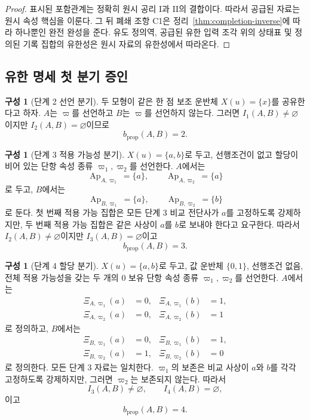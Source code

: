\documentclass[11pt]{article}
\newcommand{\Ap}{\operatorname{Ap}}
\theoremstyle{definition}
\newtheorem{construction}[theorem]{구성}
\theoremstyle{remark}
\begin{document}
\begin{proof}
표시된 포함관계는 정확히 원시 공리 I과 II의 결합이다.
따라서 공급된 자료는 원시 속성 핵심을 이룬다.
그 뒤 폐쇄 조항 C1은 정리~\ref{thm:completion-inverse}에 따라 하나뿐인 완전 완성을 준다.
유도 정의역, 공급된 유한 입력 조각 위의 상태표 및 정의된 기록 집합의 유한성은 원시 자료의 유한성에서 따라온다.
\end{proof}

\subsection{유한 명세 첫 분기 증인}

\begin{construction}[단계 2 선언 분기]
두 모형이 같은 한 점 보조 운반체 \(X(u)=\{x\}\)를 공유한다고 하자.
\(A\)는 \(\varpi\)를 선언하고 \(B\)는 \(\varpi\)를 선언하지 않는다.
그러면 \(I_1(A,B)\neq\varnothing\)이지만 \(I_2(A,B)=\varnothing\)이므로
\[
b_{\mathrm{prop}}(A,B)=2.
\]
\end{construction}

\begin{construction}[단계 3 적용 가능성 분기]
\(X(u)=\{a,b\}\)로 두고, 선행조건이 없고 할당이 비어 있는 단항 속성 종류 \(\varpi_1,\varpi_2\)를 선언한다.
\(A\)에서는
\[
\Ap_{A,\varpi_1}=\{a\},
\qquad
\Ap_{A,\varpi_2}=\{a\}
\]
로 두고, \(B\)에서는
\[
\Ap_{B,\varpi_1}=\{a\},
\qquad
\Ap_{B,\varpi_2}=\{b\}
\]
로 둔다.
첫 번째 적용 가능 집합은 모든 단계 3 비교 전단사가 \(a\)를 고정하도록 강제하지만, 두 번째 적용 가능 집합은 같은 사상이 \(a\)를 \(b\)로 보내야 한다고 요구한다.
따라서 \(I_2(A,B)\neq\varnothing\)이지만 \(I_3(A,B)=\varnothing\)이고
\[
b_{\mathrm{prop}}(A,B)=3.
\]
\end{construction}

\begin{construction}[단계 4 할당 분기]
\(X(u)=\{a,b\}\)로 두고, 값 운반체 \(\{0,1\}\), 선행조건 없음, 전체 적용 가능성을 갖는 두 개의 0 보유 단항 속성 종류 \(\varpi_1,\varpi_2\)를 선언한다.
\(A\)에서는
\[
\begin{aligned}
\Xi_{A,\varpi_1}(a)&=0,&\Xi_{A,\varpi_1}(b)&=1,\\
\Xi_{A,\varpi_2}(a)&=0,&\Xi_{A,\varpi_2}(b)&=1
\end{aligned}
\]
로 정의하고, \(B\)에서는
\[
\begin{aligned}
\Xi_{B,\varpi_1}(a)&=0,&\Xi_{B,\varpi_1}(b)&=1,\\
\Xi_{B,\varpi_2}(a)&=1,&\Xi_{B,\varpi_2}(b)&=0
\end{aligned}
\]
로 정의한다.
모든 단계 3 자료는 일치한다.
\(\varpi_1\)의 보존은 비교 사상이 \(a\)와 \(b\)를 각각 고정하도록 강제하지만, 그러면 \(\varpi_2\)는 보존되지 않는다.
따라서
\[
I_3(A,B)\neq\varnothing,
\qquad
I_4(A,B)=\varnothing,
\]
이고
\[
b_{\mathrm{prop}}(A,B)=4.
\]
\end{construction}
\end{document}
